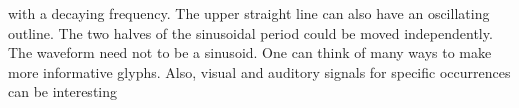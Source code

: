 																																																																																																																																																																																																																																																																																																																																																																																																															with a decaying frequency.
																																																																																																																																																																																																																																																																																																																																																																																																															The upper straight line can also have an oscillating outline.
																																																																																																																																																																																																																																																																																																																																																																																																															The two halves of the sinusoidal period could be moved independently.
																																																																																																																																																																																																																																																																																																																																																																																																															The waveform need not to be a sinusoid.
																																																																																																																																																																																																																																																																																																																																																																																																															One can think of many ways to make more informative glyphs.
																																																																																																																																																																																																																																																																																																																																																																																																															Also, visual and auditory signals for specific occurrences can be interesting
